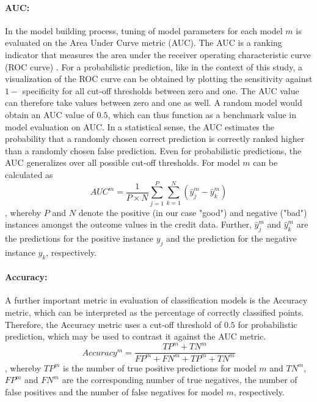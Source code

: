 \documentclass[12pt]{article}
\begin{document}
\paragraph{AUC:} In the model building process, tuning of model parameters for each model $m$ is evaluated on the Area Under Curve metric (AUC). The AUC is a ranking indicator that measures the area under the receiver operating characteristic curve (ROC curve) \citep{hanley1982meaning}. For a probabilistic prediction, like in the context of this study, a visualization of the ROC curve can be obtained by plotting the sensitivity against $1 -$ specificity for all cut-off thresholds between zero and one. The AUC value can therefore take values between zero and one as well. A random model would obtain an AUC value of $0.5$, which can thus function as a benchmark value in model evaluation on AUC. In a statistical sense, the AUC estimates the probability that a randomly chosen correct prediction is correctly ranked higher than a randomly chosen false prediction. Even for probabilistic predictions, the AUC generalizes over all possible cut-off thresholds. For model $m$ can be calculated as
\begin{equation}
AUC^m = \frac{1}{P \times N}\sum_{j=1}^{P}\sum_{k=1}^{N}(\hat{y}^m_j - \hat{y}^m_k)
\end{equation}
, whereby $P$ and $N$ denote the positive (in our case "good") and negative ("bad") instances amongst the outcome values in the credit data. Further, $\hat{y}^m_j$ and $\hat{y}^m_k$ are the predictions for the positive instance $y_j$ and the prediction for the negative instance $y_k$, respectively.

\paragraph{Accuracy:} A further important metric in evaluation of classification models is the Accuracy metric, which can be interpreted as the percentage of correctly classified points. Therefore, the Accuracy metric uses a cut-off threshold of $0.5$ for probabilistic prediction, which may be used to contrast it against the AUC metric.
\begin{equation}
Accuracy^m = \frac{TP^m + TN^m}{FP^m + FN^m + TP^m + TN^m}
\end{equation}
, whereby $TP^m$ is the number of true positive predictions for model $m$ and $TN^m$, $FP^m$ and $FN^m$ are the corresponding number of true negatives, the number of false positives and the number of false negatives for model $m$, respectively.
\end{document}
